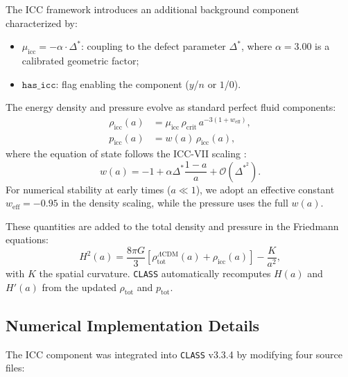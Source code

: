 \documentclass[11pt,a4paper]{article}
\newcommand{\lcdm}{\Lambda\mathrm{CDM}}
\newcommand{\DeltaStar}{\Delta^{\ast}}
\newcommand{\muicc}{\mu_{\mathrm{icc}}}
\newcommand{\class}{\texttt{CLASS}}
\newcommand{\code}[1]{\texttt{#1}}
\begin{document}
The ICC framework introduces an additional background component characterized by:
\begin{itemize}
    \item $\muicc = -\alpha \cdot \DeltaStar$: coupling to the defect parameter $\DeltaStar$, where $\alpha = 3.00$ is a calibrated geometric factor;
    \item $\code{has\_icc}$: flag enabling the component ($y$/$n$ or $1$/$0$).
\end{itemize}

The energy density and pressure evolve as standard perfect fluid components:
\begin{align}
\rho_{\text{icc}}(a) &= \muicc \, \rho_{\text{crit}} \, a^{-3(1+w_{\text{eff}})}, \label{eq:rho_icc} \\
p_{\text{icc}}(a) &= w(a) \, \rho_{\text{icc}}(a), \label{eq:p_icc}
\end{align}
where the equation of state follows the ICC-VII scaling \cite{gimranov2025icc}:
\begin{equation}
w(a) = -1 + \alpha \DeltaStar \frac{1-a}{a} + \mathcal{O}(\DeltaStar^2).
\end{equation}
For numerical stability at early times ($a \ll 1$), we adopt an effective constant $w_{\text{eff}} = -0.95$ in the density scaling, while the pressure uses the full $w(a)$.

These quantities are added to the total density and pressure in the Friedmann equations:
\begin{equation}
H^2(a) = \frac{8\pi G}{3} \left[ \rho_{\text{tot}}^{\lcdm}(a) + \rho_{\text{icc}}(a) \right] - \frac{K}{a^2},
\end{equation}
with $K$ the spatial curvature. \class{} automatically recomputes $H(a)$ and $H'(a)$ from the updated $\rho_{\text{tot}}$ and $p_{\text{tot}}$.

\subsection{Numerical Implementation Details}
\label{subsec:implementation}

The ICC component was integrated into \class{} v3.3.4 by modifying four source files:
\end{document}

